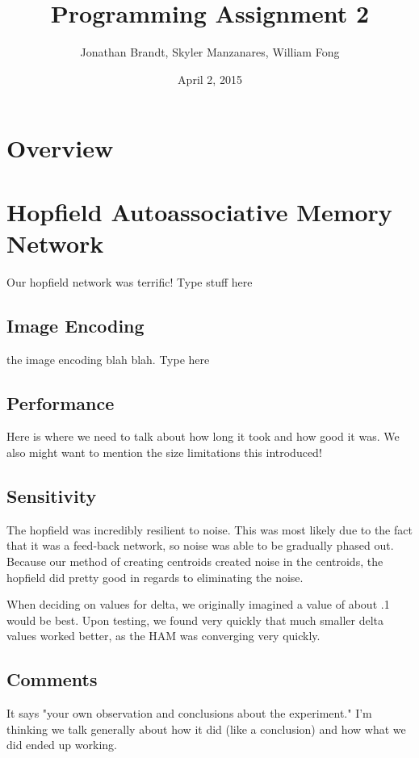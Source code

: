 \documentclass{article}
\begin{document}
\author{Jonathan Brandt, Skyler Manzanares, William Fong}
\date{April 2, 2015}
\title{Programming Assignment 2}

\maketitle

\section{Overview}

\section{Hopfield Autoassociative Memory Network}
Our hopfield network was terrific! Type stuff here

\subsection{Image Encoding}
the image encoding blah blah. Type here

\subsection{Performance}
Here is where we need to talk about how long it took and how good it was. We
also might want to mention the size limitations this introduced!

\subsection{Sensitivity}
The hopfield was incredibly resilient to noise. This was most likely due to the fact that it was a feed-back network, so noise was able to be gradually phased out. Because our method of creating centroids created noise in the centroids, the hopfield did pretty good in regards to eliminating the noise.

When deciding on values for delta, we originally imagined a value of about .1 would be best. Upon testing, we found very quickly that much smaller delta values worked better, as the HAM was converging very quickly.

\subsection{Comments}
It says "your own observation and conclusions about the experiment."
I'm thinking we talk generally about how it did (like a conclusion) and how
what we did ended up working.
\end{document}
